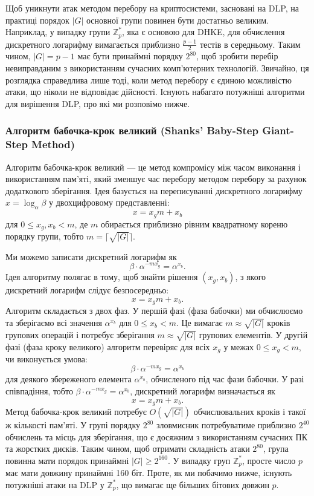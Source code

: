 \documentclass[12pt]{report}
\theoremstyle{definition}
\theoremstyle{plain}
\begin{document}
Щоб уникнути атак методом перебору на криптосистеми, засновані на DLP, на практиці порядок \( |G| \) основної групи повинен бути достатньо великим. Наприклад, у випадку групи \( \mathbb{Z}^*_p \), яка є основою для DHKE, для обчислення дискретного логарифму вимагається приблизно \( \frac{p-1}{2} \) тестів в середньому. Таким чином, \( |G| = p - 1 \) має бути принаймні порядку \( 2^{80} \), щоб зробити перебір невиправданим з використанням сучасних комп'ютерних технологій. Звичайно, ця розглядка справедлива лише тоді, коли метод перебору є єдиною можливістю атаки, що ніколи не відповідає дійсності. Існують набагато потужніші алгоритми для вирішення DLP, про які ми розповімо нижче.

\subsubsection{Алгоритм бабочка-крок великий (Shanks’ Baby-Step Giant-Step Method)}

Алгоритм бабочка-крок великий — це метод компромісу між часом виконання і використанням пам'яті, який зменшує час перебору методом перебору за рахунок додаткового зберігання. Ідея базується на переписуванні дискретного логарифму \( x = \log_\alpha \beta \) у двохцифровому представленні:
\[
x = x_g m + x_b
\]
для \( 0 \leq x_g, x_b < m \),
де \( m \) обирається приблизно рівним квадратному кореню порядку групи, тобто \( m = \lceil \sqrt{|G|} \rceil \).

Ми можемо записати дискретний логарифм як
\[
\beta \cdot \alpha^{-m x_g} = \alpha^{x_b}.
\]
Ідея алгоритму полягає в тому, щоб знайти рішення \( (x_g, x_b) \), з якого дискретний логарифм слідує безпосередньо:
\[
x = x_g m + x_b.
\]
Алгоритм складається з двох фаз. У першій фазі (фаза бабочки) ми обчислюємо та зберігаємо всі значення \( \alpha^{x_b} \) для \( 0 \leq x_b < m \). Це вимагає \( m \approx \sqrt{|G|} \) кроків групових операцій і потребує зберігання \( m \approx \sqrt{|G|} \) групових елементів. У другій фазі (фаза кроку великого) алгоритм перевіряє для всіх \( x_g \) у межах \( 0 \leq x_g < m \), чи виконується умова:
\[
\beta \cdot \alpha^{-m x_g} = \alpha^{x_b}
\]
для деякого збереженого елемента \( \alpha^{x_b} \), обчисленого під час фази бабочки. У разі співпадіння, тобто \( \beta \cdot \alpha^{-m x_g} = \alpha^{x_b} \), дискретний логарифм визначається як
\[
x = x_g m + x_b.
\]
Метод бабочка-крок великий потребує \( O(\sqrt{|G|}) \) обчислювальних кроків і такої ж кількості пам'яті. У групі порядку \( 2^{80} \) зловмисник потребуватиме приблизно \( 2^{40} \) обчислень та місць для зберігання, що є досяжним з використанням сучасних ПК та жорстких дисків. Таким чином, щоб отримати складність атаки \( 2^{80} \), група повинна мати порядок принаймні \( |G| \geq 2^{160} \). У випадку груп \( \mathbb{Z}^*_p \), просте число \( p \) має мати довжину принаймні 160 біт. Проте, як ми побачимо нижче, існують потужніші атаки на DLP у \( \mathbb{Z}^*_p \), що вимагає ще більших бітових довжин \( p \).
\end{document}
